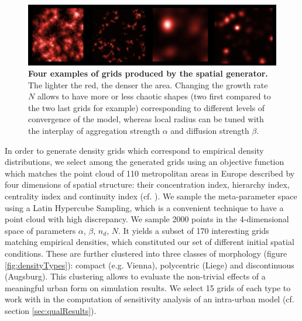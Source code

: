 \documentclass[3p,times,procedia]{elsarticle}
\begin{document}
\begin{figure}[htbp] \begin{center} 
	\includegraphics[width=\linewidth]{figures/spatialGen.png}
 \caption{\textbf{Four examples of grids produced by the spatial generator.} The lighter the red, the denser the area. Changing the growth rate $N$ allows to have more or less chaotic shapes (two first compared to the two last grids for example) corresponding to different levels of convergence of the model, whereas local radius can be tuned with the interplay of aggregation strength $\alpha$ and diffusion strength $\beta$. }
\label{fig:spatialGen}
\end{center}
\end{figure} %



In order to generate density grids which correspond to empirical density distributions, we select among the generated grids using an objective function which matches the point cloud of 110 metropolitan areas in Europe described by four dimensions of spatial structure: their concentration index, hierarchy index, centrality index and continuity index (cf. \cite{LeNechet2015}). We sample the meta-parameter space using a Latin Hypercube Sampling, which is a convenient technique to have a point cloud with high discrepancy. We sample 2000 points in the 4-dimensional space of parameters {$\alpha$, $\beta$, $n_d$, $N$}. It yields a subset of 170 interesting grids matching empirical densities, which constituted our set of different initial spatial conditions. These are further clustered into three classes of morphology (figure \ref{fig:densityTypes}): compact (e.g. Vienna), polycentric (Liege) and discontinuous (Augsburg). This clustering allows to evaluate the non-trivial effects of a meaningful urban form on simulation results. We select 15 grids of each type to work with in the computation of sensitivity analysis of an intra-urban model (cf. section \ref{sec:qualResults}).
\end{document}
